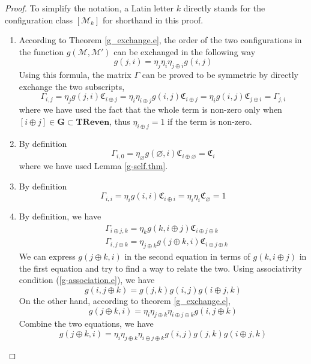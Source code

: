 \documentclass[12font]{article}
\theoremstyle{definition}
\numberwithin{equation}{section}
\newcommand{\bo}[1]{\mathbf{#1}}
\newcommand{\TReven}{\bo{TReven}}
\newcommand{\Good}{\bo{G}}
\begin{document}
\begin{proof}
To simplify the notation, a Latin letter $k$ directly stands for the configuration class $[\mathcal{M}_k]$ for shorthand in this proof.
\begin{enumerate}
  \item According to Theorem \ref{g_exchange.e}, the order of the two configurations in the function $g(\mathcal{M}, \mathcal{M}')$ can be exchanged in the following way
      \[
      g({j},i) = \eta_{{j}}\eta_{i}\eta_{{j}\oplus i} g(i,{j}) 
      \]
      Using this formula, the matrix $\Gamma$ can be proved to be symmetric by directly exchange the two subscripts,
      \[
      \Gamma_{i,j} = \eta_{{j}}g({j},i) \mathfrak{C}_{i\oplus{j}} = \eta_{i}\eta_{i\oplus{j}} g(i,{j}) \mathfrak{C}_{i\oplus{j}} 
      =
      \eta_{i} g(i,{j}) \mathfrak{C}_{{j}\oplus{i}} = \Gamma_{j,i} 
      \]
      where we have used the fact that the whole term is non-zero only when $[{i}\oplus{j}]\in\Good\subset\TReven$, thus $\eta_{{i}\oplus{j}}=1$ if the term is non-zero.
  \item By definition
    \[
    \Gamma_{i,0} = \eta_{\varnothing}g(\varnothing,{i}) \mathfrak{C}_{{i}\oplus\varnothing} = \mathfrak{C}_{{i}}
    \]
    where we have used Lemma \ref{g-self.thm}. 
  \item By definition
    \[
    \Gamma_{i,i} = \eta_{{i}}g({i},{i}) \mathfrak{C}_{{i}\oplus{i}} = \eta_{{i}}\eta_{{i}}\mathfrak{C}_{\varnothing} = 1
    \]
  \item By definition, we have
    \[
    \begin{aligned}
    & \Gamma_{i\oplus j,k} = \eta_{{k}} g({k},{i}\oplus{j}) \mathfrak{C}_{{i}\oplus{j}\oplus{k}} \\
    & \Gamma_{i,j\oplus k} = \eta_{{j}\oplus{k}} g({j}\oplus{k},{i}) \mathfrak{C}_{{i}\oplus{j}\oplus{k}}
    \end{aligned}
    \]
    We can express $g({j}\oplus{k},{i})$ in the second equation in terms of $g({k},{i}\oplus{j})$ in the first equation and try to find a way to relate the two. 
    Using associativity condition (\ref{g-association.e}), we have
    \[
      g({i},{j}\oplus{k}) = g({j},{k}) g({i},{j}) g({i}\oplus{j}, {k})
    \]
    On the other hand, according to theorem \ref{g_exchange.e}, 
    \[
    g({j}\oplus{k},{i}) = \eta_{{i}} \eta_{{j}\oplus{k}} \eta_{{i}\oplus{j}\oplus{k}} g({i},{j}\oplus{k})
    \]
    Combine the two equations, we have
    \[
    g({j}\oplus{k},{i}) = \eta_{{i}} \eta_{{j}\oplus{k}} \eta_{{i}\oplus{j}\oplus{k}} g(i,j) g({j},{k}) g({i}\oplus{j},{k})
\]
\end{enumerate}
\end{proof}
\end{document}
